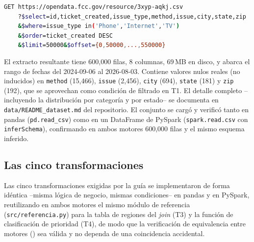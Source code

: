 \documentclass[11pt,a4paper]{article}
\begin{document}
\begin{lstlisting}[language=bash,caption={Extracción del dataset vía la API SODA de la FCC (paginada en bloques de 50,000 filas).},label={lst:extraccion-dataset}]
GET https://opendata.fcc.gov/resource/3xyp-aqkj.csv
    ?$select=id,ticket_created,issue_type,method,issue,city,state,zip
    &$where=issue_type in('Phone','Internet','TV')
    &$order=ticket_created DESC
    &$limit=50000&$offset={0,50000,...,550000}
\end{lstlisting}

El extracto resultante tiene 600{,}000 filas, 8 columnas, 69\,MB en disco, y abarca el rango de
fechas del 2024-09-06 al 2026-08-03. Contiene valores nulos reales (no inducidos) en
\texttt{method} (15{,}466), \texttt{issue} (2{,}456), \texttt{city} (694), \texttt{state} (181)
y \texttt{zip} (192), que se aprovechan como condición de filtrado en T1. El detalle completo
--incluyendo la distribución por categoría y por estado-- se documenta en
\texttt{data/README\_dataset.md} del repositorio. El conjunto se cargó y verificó tanto en
pandas (\texttt{pd.read\_csv}) como en un DataFrame de PySpark (\texttt{spark.read.csv} con
\texttt{inferSchema}), confirmando en ambos motores 600{,}000 filas y el mismo esquema inferido.

    \subsection{Las cinco transformaciones}
    \label{sec:procedimiento-transformaciones}

    Las cinco transformaciones exigidas por la guía se implementaron de forma idéntica --misma
    lógica de negocio, mismas condiciones-- en pandas y en PySpark, reutilizando en ambos motores el
    mismo módulo de referencia (\texttt{src/referencia.py}) para la tabla de regiones del
    \emph{join} (T3) y la función de clasificación de prioridad (T4), de modo que la verificación de
    equivalencia entre motores () sea válida y no dependa de una coincidencia
    accidental.
\end{document}
